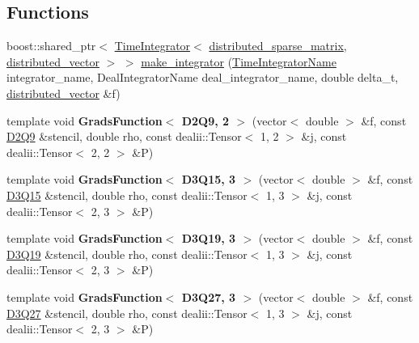 \subsection*{Functions}
\begin{DoxyCompactItemize}
\item 
boost::shared\_\-ptr$<$ \hyperlink{classnatrium_1_1TimeIntegrator}{TimeIntegrator}$<$ \hyperlink{namespacenatrium_a860e92befb23651241c8b3d61a0d4034}{distributed\_\-sparse\_\-matrix}, \hyperlink{namespacenatrium_a903d2b92917f582f2ff05f52160ab811}{distributed\_\-vector} $>$ $>$ \hyperlink{namespacenatrium_aaa8bf70405092ec81a8b15331a8f24b5}{make\_\-integrator} (\hyperlink{namespacenatrium_a00a0ec1e80f138680e0fcca78349f6d8}{TimeIntegratorName} integrator\_\-name, DealIntegratorName deal\_\-integrator\_\-name, double delta\_\-t, \hyperlink{namespacenatrium_a903d2b92917f582f2ff05f52160ab811}{distributed\_\-vector} \&f)
\item 
\hypertarget{namespacenatrium_a0cef4fe0f0b48bfd41191cdccc8fd098}{
template void {\bfseries GradsFunction$<$ D2Q9, 2 $>$} (vector$<$ double $>$ \&f, const \hyperlink{classnatrium_1_1D2Q9}{D2Q9} \&stencil, double rho, const dealii::Tensor$<$ 1, 2 $>$ \&j, const dealii::Tensor$<$ 2, 2 $>$ \&P)}
\label{namespacenatrium_a0cef4fe0f0b48bfd41191cdccc8fd098}

\item 
\hypertarget{namespacenatrium_ad404daaac7f20207f08ff5f211a2721c}{
template void {\bfseries GradsFunction$<$ D3Q15, 3 $>$} (vector$<$ double $>$ \&f, const \hyperlink{classnatrium_1_1D3Q15}{D3Q15} \&stencil, double rho, const dealii::Tensor$<$ 1, 3 $>$ \&j, const dealii::Tensor$<$ 2, 3 $>$ \&P)}
\label{namespacenatrium_ad404daaac7f20207f08ff5f211a2721c}

\item 
\hypertarget{namespacenatrium_a67c2e91582d49b0a53b79ea9e5200d75}{
template void {\bfseries GradsFunction$<$ D3Q19, 3 $>$} (vector$<$ double $>$ \&f, const \hyperlink{classnatrium_1_1D3Q19}{D3Q19} \&stencil, double rho, const dealii::Tensor$<$ 1, 3 $>$ \&j, const dealii::Tensor$<$ 2, 3 $>$ \&P)}
\label{namespacenatrium_a67c2e91582d49b0a53b79ea9e5200d75}

\item 
\hypertarget{namespacenatrium_ab812c6cdcf3b271b97c19d49332286bc}{
template void {\bfseries GradsFunction$<$ D3Q27, 3 $>$} (vector$<$ double $>$ \&f, const \hyperlink{classnatrium_1_1D3Q27}{D3Q27} \&stencil, double rho, const dealii::Tensor$<$ 1, 3 $>$ \&j, const dealii::Tensor$<$ 2, 3 $>$ \&P)}
\label{namespacenatrium_ab812c6cdcf3b271b97c19d49332286bc}


\end{DoxyCompactItemize}
